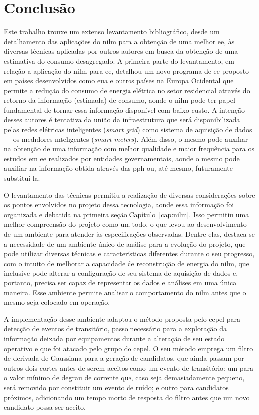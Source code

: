 \chapter{Conclusão}
\label{chap:conclusao}

Este trabalho trouxe um extenso levantamento bibliográfico, desde um
detalhamento das aplicações do \acs{nilm} para a obtenção de uma
melhor \acs{ee}, às diversas técnicas aplicadas por outros autores
em busca da obtenção de uma estimativa do consumo desagregado. A
primeira parte do levantamento, em relação a aplicação do \acs{nilm}
para \acs{ee}, detalhou um novo programa de \acs{ee} proposto em
países desenvolvidos como \acs{eua} e outros países na Europa
Ocidental que permite a redução do consumo de energia elétrica no
setor residencial através do retorno da informação (estimada) de
consumo, aonde o \acs{nilm} pode ter papel fundamental de tornar essa
informação disponível com baixo custo. A intenção desses autores é
tentativa da união da infraestrutura que será disponibilizada pelas
redes elétricas inteligentes (\emph{smart grid}) como sistema de
aquisição de dados --- os medidores inteligentes (\emph{smart
meters}). Além disso, o mesmo pode auxiliar na obtenção de uma
informação com melhor qualidade e maior frequência para os estudos em
\acs{ee} realizados por entidades governamentais, aonde o mesmo pode
auxiliar na informação obtida através das \acf{pph} ou, até mesmo,
futuramente substituí-la.

O levantamento das técnicas permitiu a realização de diversas
considerações sobre os pontos envolvidos no projeto dessa tecnologia,
aonde essa informação foi organizada e debatida na primeira seção
Capítulo~\ref{cap:nilm}. Isso permitiu uma melhor compreensão do
projeto como um todo, o que levou ao desenvolvimento de um ambiente
para atender às especificações observadas. Dentre elas, destaca-se a
necessidade de um ambiente único de análise para a evolução do
projeto, que pode utilizar diversas técnicas e características
diferentes durante o seu progresso, com o intuito de melhorar a
capacidade de reconstrução de energia do \acs{nilm}, que inclusive
pode alterar a configuração de seu sistema de aquisição de dados e,
portanto, precisa ser capaz de representar os dados e análises em uma
única maneira. Esse ambiente permite analisar o comportamento do
\acs{nilm} antes que o mesmo seja colocado em operação.

A implementação desse ambiente adaptou o método proposta pelo
\acs{cepel} para detecção de eventos de transitório, passo necessário
para a exploração da informação deixada por equipamentos durante a
alteração de seu estado operativo e que foi atacado pelo grupo do
\acs{cepel}. O seu método emprega um filtro de derivada de
Gaussiana para a geração de candidatos, que ainda passam por outros
dois cortes antes de serem aceitos como um evento de transitório: um
para o valor mínimo de degrau de corrente que, caso seja
demasiadamente pequeno, será removido por constituir um evento de
ruído; e outro para candidatos próximos, adicionando um tempo morto de
resposta do filtro antes que um novo candidato possa ser aceito.

